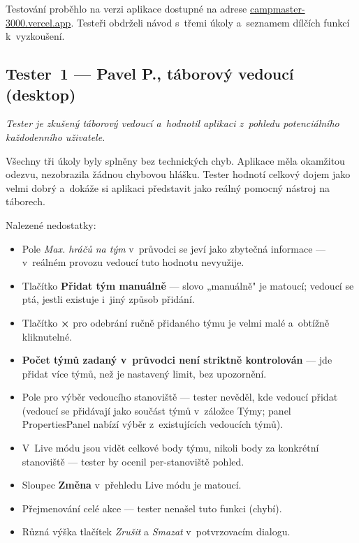 ﻿\documentclass[a4paper,12pt]{article}
\begin{document}
Testování proběhlo na verzi aplikace dostupné na adrese
\href{https://campmaster-3000.vercel.app/}{campmaster-3000.vercel.app}.
Testeři obdrželi návod s~třemi úkoly a~seznamem dílčích funkcí k~vyzkoušení.

\subsection{Tester~1 — Pavel P., táborový vedoucí (desktop)}

\textit{Tester je zkušený táborový vedoucí a~hodnotil aplikaci z~pohledu
potenciálního každodenního uživatele.}

Všechny tři úkoly byly splněny bez technických chyb. Aplikace měla okamžitou
odezvu, nezobrazila žádnou chybovou hlášku. Tester hodnotí celkový dojem jako
velmi dobrý a~dokáže si aplikaci představit jako reálný pomocný nástroj na
táborech.

Nalezené nedostatky:

\begin{itemize}
  \item Pole \emph{Max. hráčů na tým} v~průvodci se jeví jako zbytečná
    informace — v~reálném provozu vedoucí tuto hodnotu nevyužije.
  \item Tlačítko \textbf{Přidat tým manuálně} — slovo „manuálně" je matoucí;
    vedoucí se ptá, jestli existuje i~jiný způsob přidání.
  \item Tlačítko \textbf{×} pro odebrání ručně přidaného týmu je velmi malé
    a~obtížně kliknutelné.
  \item \textbf{Počet týmů zadaný v~průvodci není striktně kontrolován} —
    jde přidat více týmů, než je nastavený limit, bez upozornění.
  \item Pole pro výběr vedoucího stanoviště — tester nevěděl, kde vedoucí
    přidat (vedoucí se přidávají jako součást týmů v~záložce Týmy; panel
    PropertiesPanel nabízí výběr z~existujících vedoucích týmů).
  \item V~Live módu jsou vidět celkové body týmu, nikoli body za konkrétní
    stanoviště — tester by ocenil per-stanoviště pohled.
  \item Sloupec \textbf{Změna} v~přehledu Live módu je matoucí.
  \item Přejmenování celé akce — tester nenašel tuto funkci (chybí).
  \item Různá výška tlačítek \emph{Zrušit} a \emph{Smazat} v~potvrzovacím
    dialogu.
\end{itemize}
\end{document}
